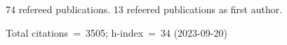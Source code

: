74 refereed publications. 13 refeered publications as first author.

Total citations~=~3505; h-index~=~34 (2023-09-20)